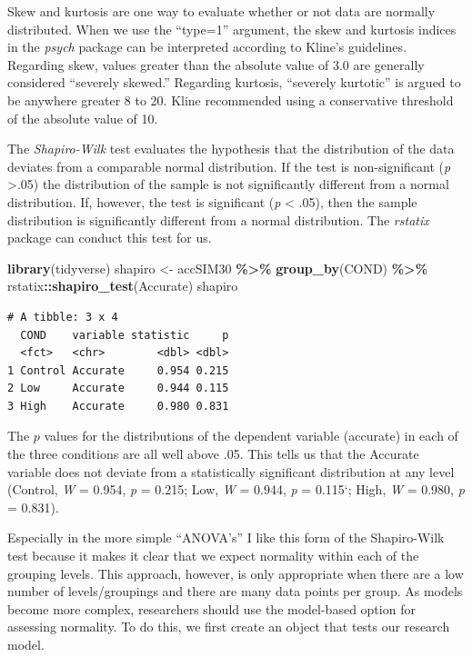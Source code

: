 \documentclass[
  11pt,
]{book}
\newenvironment{Shaded}{\begin{snugshade}}{\end{snugshade}}
\newcommand{\FunctionTok}[1]{\textcolor[rgb]{0.27,0.27,0.27}{\textbf{#1}}}
\newcommand{\NormalTok}[1]{#1}
\newcommand{\OtherTok}[1]{\textcolor[rgb]{0.37,0.37,0.37}{#1}}
\newcommand{\SpecialCharTok}[1]{\textcolor[rgb]{0.43,0.43,0.43}{\textbf{#1}}}
\begin{document}
Skew and kurtosis are one way to evaluate whether or not data are normally distributed. When we use the ``type=1'' argument, the skew and kurtosis indices in the \emph{psych} package can be interpreted according to Kline's \citeyearpar{kline_data_2016} guidelines. Regarding skew, values greater than the absolute value of 3.0 are generally considered ``severely skewed.'' Regarding kurtosis, ``severely kurtotic'' is argued to be anywhere greater 8 to 20. Kline recommended using a conservative threshold of the absolute value of 10.

The \emph{Shapiro-Wilk} test evaluates the hypothesis that the distribution of the data deviates from a comparable normal distribution. If the test is non-significant (\emph{p} \textgreater.05) the distribution of the sample is not significantly different from a normal distribution. If, however, the test is significant (\emph{p} \textless{} .05), then the sample distribution is significantly different from a normal distribution. The \emph{rstatix} package can conduct this test for us.

\begin{Shaded}
\begin{Highlighting}[]
\FunctionTok{library}\NormalTok{(tidyverse)}
\NormalTok{shapiro }\OtherTok{\textless{}{-}}\NormalTok{ accSIM30 }\SpecialCharTok{\%\textgreater{}\%}
    \FunctionTok{group\_by}\NormalTok{(COND) }\SpecialCharTok{\%\textgreater{}\%}
\NormalTok{    rstatix}\SpecialCharTok{::}\FunctionTok{shapiro\_test}\NormalTok{(Accurate)}
\NormalTok{shapiro}
\end{Highlighting}
\end{Shaded}

\begin{verbatim}
# A tibble: 3 x 4
  COND    variable statistic     p
  <fct>   <chr>        <dbl> <dbl>
1 Control Accurate     0.954 0.215
2 Low     Accurate     0.944 0.115
3 High    Accurate     0.980 0.831
\end{verbatim}

The \(p\) values for the distributions of the dependent variable (accurate) in each of the three conditions are all well above .05. This tells us that the Accurate variable does not deviate from a statistically significant distribution at any level (Control, \emph{W} = 0.954, \emph{p} = 0.215; Low, \emph{W} = 0.944, \emph{p} = 0.115`; High, \emph{W} = 0.980, \emph{p} = 0.831).

Especially in the more simple ``ANOVA's'' I like this form of the Shapiro-Wilk test because it makes it clear that we expect normality within each of the grouping levels. This approach, however, is only appropriate when there are a low number of levels/groupings and there are many data points per group. As models become more complex, researchers should use the model-based option for assessing normality. To do this, we first create an object that tests our research model.
\end{document}
